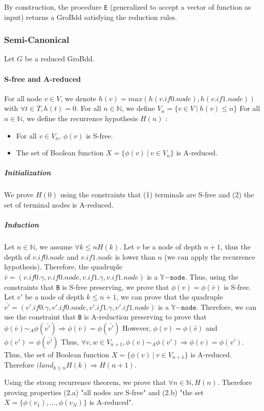 \documentclass[a4paper,10pt]{article}
\newcommand{\N}{\mathbb{N}}%
\newcommand{\Y}{\mathbb{Y}}%
\newcommand{\Ynode}{\Y\mathtt{-node}}
\begin{document}
By construction, the procedure \texttt{E} (generalized to accept a vector of function as input) returns a GroBdd satisfying the reduction rules.

\subsubsection{Semi-Canonical}

Let $G$ be a reduced GroBdd.

\paragraph{S-free and A-reduced}
For all node $v\in V$, we denote $h(v) = max(h(v.if0.node), h(v.if1.node))$ with $\forall t\in T, h(t) = 0$.
For all $n\in\N$, we define $V_n = \{v\in V ~|~ h(v) \leq n\}$
For all $n\in\N$, we define the recurrence hypothesis $H(n)$ :\begin{itemize}
\item For all $v\in V_n$, $\phi(v)$ is S-free.
\item The set of Boolean function $X = \{\phi(v) ~|~ v\in V_n\}$ is A-reduced.
\end{itemize}

\subparagraph{Initialization}
We prove $H(0)$ using the constraints that (1) terminals are S-free and (2) the set of terminal nodes is A-reduced.

\subparagraph{Induction}
Let $n\in\N$, we assume $\forall k\leq n H(k)$.
Let $v$ be a node of depth $n+1$, thus the depth of $v.if0.node$ and $v.if1.node$ is lower than $n$ (we can apply the recurrence hypothesis).
Therefore, the quadruple $\bar{v} = (v.if0.\gamma, v.if0.node, v.if1.\gamma, v.if1.node)$ is a $\Ynode$.
Thus, using the constraints that \texttt{B} is S-free preserving, we prove that $\phi(v) = \phi(\bar{v})$ is S-free.
Let $v'$ be a node of depth $k\leq n+1$, we can prove that the quadruple $\bar{v'} = (v'.if0.\gamma, v'.if0.node, v'.if1.\gamma, v'.if1.node)$ is a $\Ynode$.
Therefore, we can use the constraint that \texttt{B} is A-reduction preserving to prove that $\phi(\bar{v}) \sim_A \phi(\bar{v'}) \Rightarrow \phi(\bar{v}) = \phi(\bar{v'})$
However, $\phi(v) = \phi(\bar{v})$ and $\phi(v') = \phi(\bar{v'})$
Thus, $\forall v, w \in V_{n+1}, \phi(v) \sim_A \phi(v') \Rightarrow \phi(v) = \phi(v')$.
Thus, the set of Boolean function $X = \{\phi(v) ~|~ v\in V_{n+1}\}$ is A-reduced.
Therefore $(land_{k\leq n} H(k) \Rightarrow H(n+1)$.

Using the strong recurrence theorem, we prove that $\forall n\in\N, H(n)$.
Therefore proving properties (2.a) "all nodes are S-free" and (2.b) "the set $X = \{\phi(v_1), \dots, \phi(v_N)\}$ is A-reduced".
\end{document}
